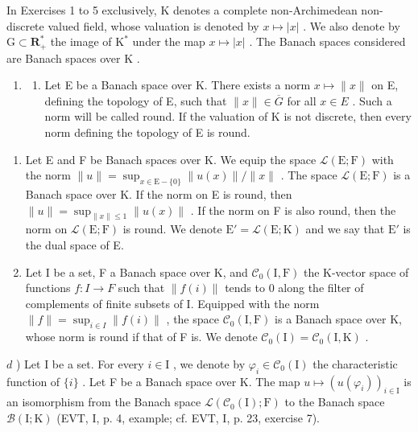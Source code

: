 \exercisesection{}

In Exercises 1 to 5 exclusively, K denotes a complete non-Archimedean non-discrete valued field, whose valuation is denoted by \(x \mapsto |x|\) . We also denote by \(\mathrm{G} \subset \mathbf{R}_{+}^{*}\) the image of \(\mathrm{K}^{*}\) under the map \(x \mapsto |x|\) . The Banach spaces considered are Banach spaces over \(\mathrm{K}\) .

\begin{enumerate}
\def\labelenumi{\arabic{enumi})}
\tightlist
\item
  \begin{enumerate}
  \def\labelenumii{\alph{enumii})}
  \tightlist
  \item
    Let E be a Banach space over K. There exists a norm \(x \mapsto \|x\|\) on E, defining the topology of E, such that \(\|x\| \in \overline{G}\) for all \(x \in E\) . Such a norm will be called round. If the valuation of K is not discrete, then every norm defining the topology of E is round.
  \end{enumerate}
\end{enumerate}

\begin{enumerate}
\def\labelenumi{\alph{enumi})}
\setcounter{enumi}{1}
\item
  Let E and F be Banach spaces over K. We equip the space \(\mathcal{L}(\mathrm{E};\mathrm{F})\) with the norm \(\| u\| = \sup_{x\in \mathrm{E}- \{0\}}\| u(x)\| /\| x\|\) . The space \(\mathcal{L}(\mathrm{E};\mathrm{F})\) is a Banach space over K. If the norm on E is round, then \(\| u\| = \sup_{\| x\| \leqslant 1}\| u(x)\|\) . If the norm on F is also round, then the norm on \(\mathcal{L}(\mathrm{E};\mathrm{F})\) is round. We denote \(\mathrm{E}' = \mathcal{L}(\mathrm{E};\mathrm{K})\) and we say that \(\mathrm{E}'\) is the dual space of E.
\item
  Let I be a set, F a Banach space over K, and \(\mathcal{C}_{0}(\mathrm{I},\mathrm{F})\) the K-vector space of functions \(f\colon I\to F\) such that \(\|f(i)\|\) tends to 0 along the filter of complements of finite subsets of I. Equipped with the norm \(\|f\|=\sup_{i\in I}\|f(i)\|\) , the space \(\mathcal{C}_{0}(\mathrm{I},\mathrm{F})\) is a Banach space over K, whose norm is round if that of F is. We denote \(\mathcal{C}_{0}(\mathrm{I})=\mathcal{C}_{0}(\mathrm{I},\mathrm{K})\) .
\end{enumerate}

\(d\) ) Let I be a set. For every \(i\in \mathrm{I}\) , we denote by \(\varphi_{i}\in \mathcal{C}_{0}(\mathrm{I})\) the characteristic function of \(\{i\}\) . Let F be a Banach space over K. The map \(u \mapsto (u(\varphi_i))_{i \in \mathrm{I}}\) is an isomorphism from the Banach space \(\mathcal{L}(\mathcal{C}_0(\mathrm{I});\mathrm{F})\) to the Banach space \(\mathcal{B}(\mathrm{I};\mathrm{K})\) (EVT, I, p. 4, example; cf. EVT, I, p. 23, exercise 7).

